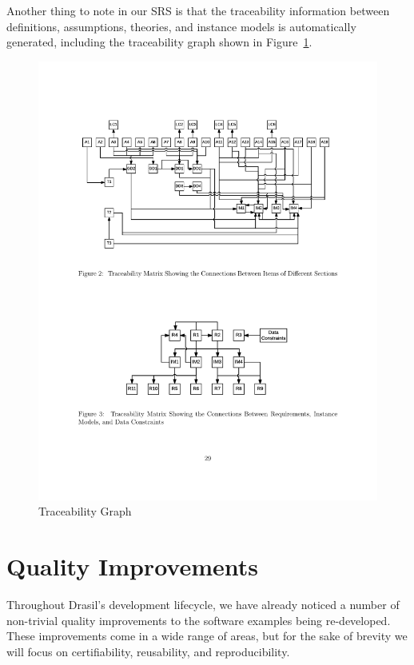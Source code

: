 \documentclass[sigconf]{acmart}
\begin{document}
Another thing to note in our SRS is that the traceability information between
definitions, assumptions, theories, and instance models is automatically 
generated, including the traceability graph shown in 
Figure~\ref{Fig_TraceGraph}.

\begin{figure}
\begin{center}
\includegraphics[scale=0.5]{./figures/TraceGraph.pdf}
\end{center}
\caption{Traceability Graph}
\label{Fig_TraceGraph}
\end{figure}

\section{Quality Improvements} \label{SecQuality}

Throughout Drasil's development lifecycle, we have already noticed a number of 
non-trivial quality improvements to the software examples being re-developed. 
These improvements come in a wide range of areas, but for the sake of brevity 
we will focus on certifiability, reusability, and reproducibility.
\end{document}
